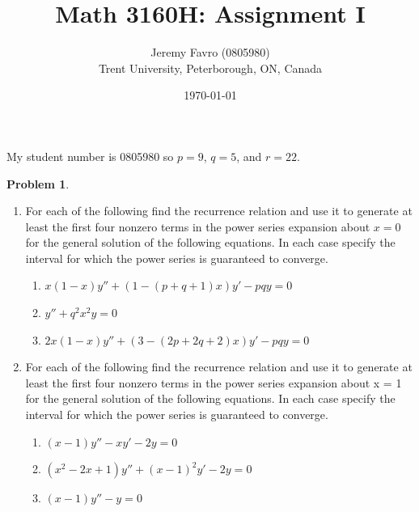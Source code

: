 \documentclass[10pt]{article}
\title{Math 3160H: Assignment I}
\author{Jeremy Favro (0805980) \\ Trent University, Peterborough, ON, Canada}
\date{\today}
\theoremstyle{definition}
\newtheorem{problem}{Problem}
\begin{document}
\maketitle
My student number is 0805980 so $p=9$, $q=5$, and $r=22$.
\begin{problem}~
\begin{enumerate}[label=(\alph*)]
  \item For each of the following find the recurrence relation and use it to generate at least the first
        four nonzero terms in the power series expansion about $x = 0$ for the general solution of the
        following equations. In each case specify the interval for which the power series is guaranteed
        to converge.
        \begin{enumerate}[label=\roman*.]
          \item $x(1 -x)y'' + (1 - (p + q + 1)x)y' - pqy = 0$
          \item $y'' + q^2x^2y = 0$
          \item $2x(1 - x)y'' + (3 - (2p + 2q + 2)x)y' - pqy = 0$
        \end{enumerate}
  \item For each of the following find the recurrence relation and use it to generate at least the first
        four nonzero terms in the power series expansion about x = 1 for the general solution of the
        following equations. In each case specify the interval for which the power series is guaranteed
        to converge.
        \begin{enumerate}[label=\roman*.]
          \item $(x - 1)y'' - xy' - 2y = 0$
          \item $(x^2 - 2x + 1)y'' + (x - 1)^2y' - 2y = 0$
          \item $(x - 1)y''- y = 0$
        \end{enumerate}
\end{enumerate}
\end{problem}
\end{document}
